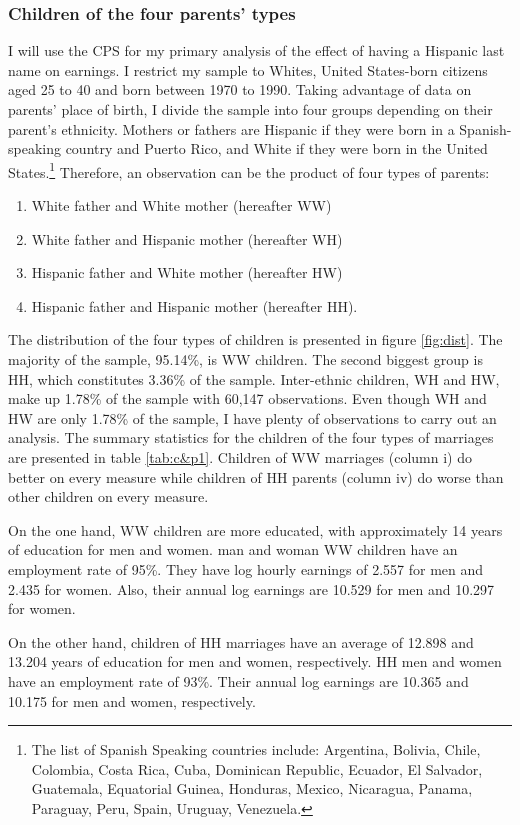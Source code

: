 \documentclass[12pt, fullpage]{article}
\begin{document}
\subsubsection{Children of the four parents' types}
I will use the CPS for my primary analysis of the effect of having a Hispanic last name on earnings. I restrict my sample to Whites, United States-born citizens aged 25 to 40 and born between 1970 to 1990. Taking advantage of data on parents' place of birth, I divide the sample into four groups depending on their parent's ethnicity. Mothers or fathers are Hispanic if they were born in a Spanish-speaking country and Puerto Rico, and White if they were born in the United States.\footnote{The list of Spanish Speaking countries include: Argentina, Bolivia, Chile, Colombia, Costa Rica, Cuba, Dominican Republic, Ecuador, El Salvador, Guatemala, Equatorial Guinea, Honduras, Mexico, Nicaragua, Panama, Paraguay, Peru, Spain, Uruguay, Venezuela.} Therefore, an observation can be the product of four types of parents: 
\begin{enumerate}
\item White father and White mother (hereafter WW) 
\item White father and Hispanic mother (hereafter WH)
\item Hispanic father and White mother (hereafter HW)
\item Hispanic father and Hispanic mother (hereafter HH).
\end{enumerate}
The distribution of the four types of children is presented in figure \ref{fig:dist}. The majority of the sample, 95.14\%, is WW children. The second biggest group is HH, which constitutes 3.36\% of the sample. Inter-ethnic children, WH and HW, make up 1.78\% of the sample with 60,147 observations. Even though WH and HW are only 1.78\% of the sample, I have plenty of observations to carry out an analysis. The summary statistics for the children of the four types of marriages are presented in table \ref{tab:c&p1}. Children of WW marriages (column i) do better on every measure while children of HH parents (column iv) do worse than other children on every measure. 


On the one hand, WW children are more educated, with approximately 14 years of education for men and women. man and woman WW children have an employment rate of 95\%. They have log hourly earnings of 2.557 for men and 2.435 for women. Also, their annual log earnings are 10.529 for men and 10.297 for women.

On the other hand, children of HH marriages have an average of 12.898 and 13.204 years of education for men and women, respectively. HH men and women have an employment rate of 93\%. Their annual log earnings are 10.365 and 10.175 for men and women, respectively. 
\end{document}
